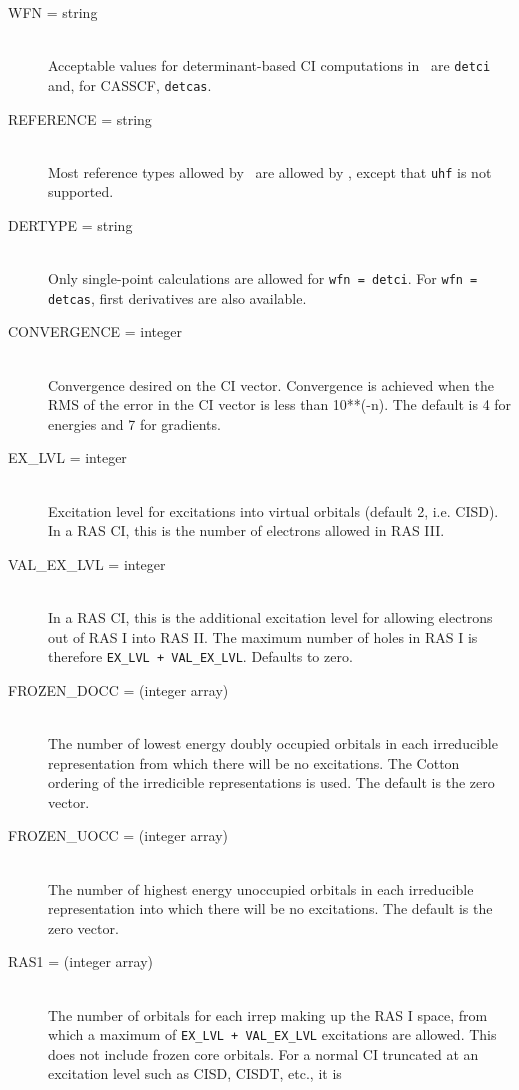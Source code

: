 \begin{description}
\item[WFN = string]\mbox{}\\
Acceptable values for determinant-based CI computations in \PSIthree\
are {\tt detci} and, for CASSCF, {\tt detcas}.
\item[REFERENCE = string]\mbox{}\\
Most reference types allowed by \PSIthree\ are allowed by \PSIdetci,
except that {\tt uhf} is not supported.
\item[DERTYPE = string]\mbox{}\\
Only single-point calculations are allowed for {\tt wfn = detci}.
For {\tt wfn = detcas}, first derivatives are also available.
\item[CONVERGENCE = integer]\mbox{}\\
Convergence desired on the CI vector.  Convergence is achieved when the
RMS of the error in the CI vector is less than 10**(-n).  The default is 4
for energies and 7 for gradients.
\item[EX\_LVL = integer]\mbox{}\\
Excitation level for excitations into virtual
orbitals (default 2, i.e. CISD).  In a RAS CI, this is the number
of electrons allowed in RAS III.
\item[VAL\_EX\_LVL = integer]\mbox{}\\
In a RAS CI, this is the additional excitation level for allowing
electrons out of RAS I into RAS II.  The maximum number of holes in RAS I
is therefore {\tt EX\_LVL + VAL\_EX\_LVL}.  Defaults to zero.
\item[FROZEN\_DOCC = (integer array)]\mbox{}\\
The number of lowest energy doubly occupied orbitals in each irreducible
representation from which there will be no excitations.
The Cotton ordering of the irredicible representations is used.
The default is the zero vector.
\item[FROZEN\_UOCC = (integer array)]\mbox{}\\
The number of highest energy unoccupied orbitals in each irreducible
representation into which there will be no excitations.
The default is the zero vector.
\item[RAS1 = (integer array)]\mbox{}\\
The number of orbitals for each irrep making up the RAS I space,
from which a maximum of {\tt EX\_LVL + VAL\_EX\_LVL} excitations
are allowed.
This does not include frozen core orbitals.  For a normal
CI truncated at an excitation level such as CISD, CISDT, etc., it is

\end{description}

